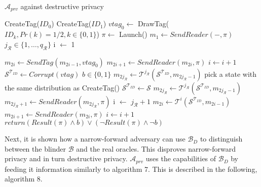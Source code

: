     \begin{algorithm}[H] %
        \centering
        \caption{$\mathcal{A}_{prv}$ against destructive privacy}
        \begin{algorithmic}[1] %
            \State CreateTag($ID_0$)
            \State CreateTag($ID_1$)
            \State $vtag_{0} \leftarrow$ DrawTag($ID_k, Pr(k)= 1/2, k \in \{0,1\}$)
            \State $\pi \leftarrow$ Launch() 
            \State $m_1 \leftarrow SendReader(-,\pi)$ 
            \State $j_{\mathcal{R}} \in \{1, \dots, q_\mathcal{R}\}$
            \State i $\leftarrow$ 1

                \State $m_{2i} \gets SendTag(m_{2i-1}, vtag_{0})$
                \State $m_{2i+1} \gets SendReader(m_{2i}, \pi)$
                \State $i \gets i+1$
            \EndWhile
            \State $\mathcal{S}^{\mathcal{T}_{ID}} \gets Corrupt(vtag)$
            \State $b \in \{0,1\}$
                \State $ m_{2j_{\mathcal{R}}} \gets \mathcal{T}^{j_{\mathcal{R}}}(\mathcal{S}^{\mathcal{T}_{ID}}, m_{2j_{\mathcal{R}}-1})$
            \Else
                \State pick a state with the same distribution as CreateTag()
                \State $\mathcal{S}^{\mathcal{T}_{ID}} \gets \mathcal{S}$
                \State $ m_{2j_{\mathcal{R}}} \gets \mathcal{T}^{j_{\mathcal{R}}}(\mathcal{S}^{\mathcal{T}_{ID}}, m_{2j_{\mathcal{R}}-1})$
            \EndIf
            \State $m_{2j_{\mathcal{R}}+1} \gets SendReader(m_{2j_{\mathcal{R}}}, \pi)$ 
            \State i $\leftarrow$ $j_{\mathcal{R}}+1$
                \State $m_{2i} \gets \mathcal{T}^{i}(\mathcal{S}^{\mathcal{T}_{ID}}, m_{2i-1})$
                \State $m_{2i+1} \gets SendReader(m_{2i}, \pi)$
                \State $i \gets i+1$
            \EndWhile       
            \State $return (Result(\pi) \land b) \lor (\lnot Result(\pi) \land \lnot b)$
        \end{algorithmic}
    \end{algorithm}

    Next, it is shown how a narrow-forward adversary can use $\mathcal{B}_D$ to distinguish between the blinder $\mathcal{B}$ and the real oracles. This disproves 
    narrow-forward privacy and in turn destructive privacy. $\mathcal{A}_{prv}$ uses the capabilities of $\mathcal{B}_D$ by feeding it information similarly to 
    algorithm 7. This is described in the following, algorithm 8. 

